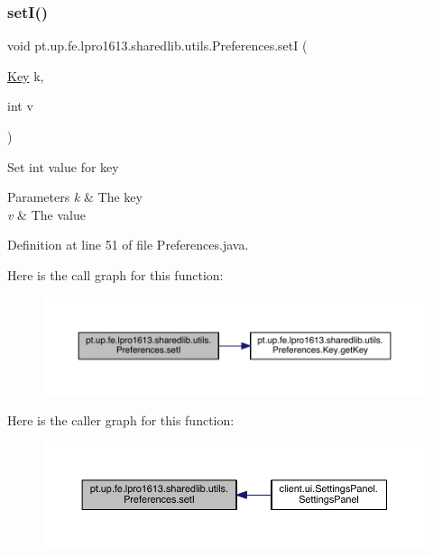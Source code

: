 \subsubsection{\texorpdfstring{set\+I()}{setI()}}
{\footnotesize\ttfamily void pt.\+up.\+fe.\+lpro1613.\+sharedlib.\+utils.\+Preferences.\+setI (\begin{DoxyParamCaption}\item[{\hyperlink{interfacept_1_1up_1_1fe_1_1lpro1613_1_1sharedlib_1_1utils_1_1_preferences_1_1_key}{Key}}]{k,  }\item[{int}]{v }\end{DoxyParamCaption})}

Set int value for key


\begin{DoxyParams}{Parameters}
{\em k} & The key \\
\hline
{\em v} & The value \\
\hline
\end{DoxyParams}


Definition at line 51 of file Preferences.\+java.

Here is the call graph for this function\+:
\nopagebreak
\begin{figure}[H]
\begin{center}
\leavevmode
\includegraphics[width=350pt]{classpt_1_1up_1_1fe_1_1lpro1613_1_1sharedlib_1_1utils_1_1_preferences_ad1e7c0fc12af226ce437da9ea8bd84f3_cgraph}
\end{center}
\end{figure}
Here is the caller graph for this function\+:
\nopagebreak
\begin{figure}[H]
\begin{center}
\leavevmode
\includegraphics[width=350pt]{classpt_1_1up_1_1fe_1_1lpro1613_1_1sharedlib_1_1utils_1_1_preferences_ad1e7c0fc12af226ce437da9ea8bd84f3_icgraph}
\end{center}
\end{figure}
\hypertarget{classpt_1_1up_1_1fe_1_1lpro1613_1_1sharedlib_1_1utils_1_1_preferences_a7ef4c07c94b75f3bb5cf27c4533f01b6}{}\label{classpt_1_1up_1_1fe_1_1lpro1613_1_1sharedlib_1_1utils_1_1_preferences_a7ef4c07c94b75f3bb5cf27c4533f01b6} 
